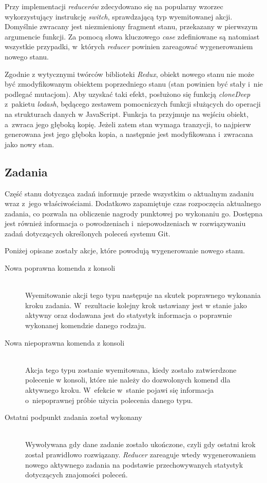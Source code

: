 \documentclass[12pt,a4paper,polish,thesis]{dcsbook}
\begin{document}
{	Przy implementacji \textit{reducerów} zdecydowano się na popularny wzorzec wykorzystujący instrukcję \textit{switch}, sprawdzającą typ wyemitowanej akcji. Domyślnie zwracany jest niezmieniony fragment stanu, przekazany w pierwszym argumencie funkcji. Za pomocą słowa kluczowego \textit{case} zdefiniowane są natomiast wszystkie przypadki, w~których \textit{reducer} powinien zareagować wygenerowaniem nowego stanu.
	
	Zgodnie z wytycznymi twórców biblioteki \textit{Redux}, obiekt nowego stanu nie może być zmodyfikowanym obiektem poprzedniego stanu (stan powinien być stały i~nie podlegać mutacjom). Aby uzyskać taki efekt, posłużono się funkcją \textit{cloneDeep} z~pakietu \textit{lodash}, będącego zestawem pomocniczych funkcji służących do operacji na strukturach danych w JavaScript. Funkcja ta przyjmuje na wejściu obiekt, a~zwraca jego głęboką kopię. Jeżeli zatem stan wymaga tranzycji, to najpierw generowana jest jego głęboka kopia, a następnie jest modyfikowana i~zwracana jako nowy stan.
	
	\subsection{Zadania}
	
	Część stanu dotycząca zadań informuje przede wszystkim o aktualnym zadaniu wraz z~jego właściwościami. Dodatkowo zapamiętuje czas rozpoczęcia aktualnego zadania, co pozwala na obliczenie nagrody punktowej po wykonaniu go. Dostępna jest również informacja o powodzeniach i~niepowodzeniach w rozwiązywaniu zadań dotyczących określonych poleceń systemu Git.
	
	Poniżej opisane zostały akcje, które powodują wygenerowanie nowego stanu.
		
	\begin{description}
	\item[Nowa poprawna komenda z konsoli] \hfill \\
	Wyemitowanie akcji tego typu następuje na skutek poprawnego wykonania kroku zadania. W~rezultacie kolejny krok ustawiany jest w stanie jako aktywny oraz dodawana jest do statystyk informacja o poprawnie wykonanej komendzie danego rodzaju.
	\item[Nowa niepoprawna komenda z konsoli] \hfill \\
	Akcja tego typu zostanie wyemitowana, kiedy zostało zatwierdzone polecenie w konsoli, które nie należy do dozwolonych komend dla aktywnego kroku. W~efekcie w~stanie pojawi się informacja o~niepoprawnej próbie użycia polecenia danego typu.
	\item[Ostatni podpunkt zadania został wykonany] \hfill \\
	Wywoływana gdy dane zadanie zostało ukończone, czyli gdy ostatni krok został prawidłowo rozwiązany. \textit{Reducer} zareaguje wtedy wygenerowaniem nowego aktywnego zadania na podstawie przechowywanych statystyk dotyczących znajomości poleceń.
	\end{description}
		
}
\end{document}
